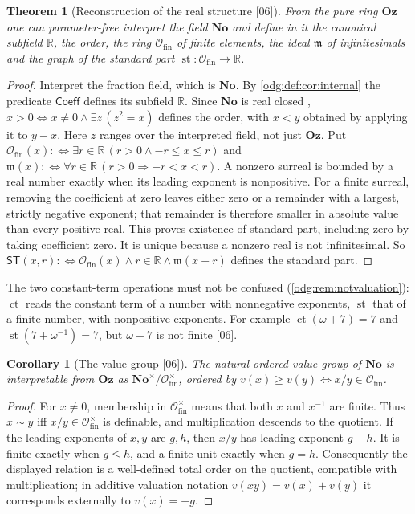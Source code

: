 \documentclass[11pt,oneside]{article}
\numberwithin{equation}{section}
\newtheorem{theorem}{Theorem}[section]
\newtheorem{corollary}[corollary]{Corollary}
\theoremstyle{definition}
\theoremstyle{remark}
\newcommand{\No}{\mathbf{No}}
\newcommand{\Oz}{\mathbf{Oz}}
\newcommand{\R}{\mathbb R}
\newcommand{\ct}{\operatorname{ct}}
\newcommand{\src}[1]{\textup{\textsf{\small[#1]}}}
\newcommand{\st}{\operatorname{st}}
\newcommand{\Ofin}{\mathcal O_{\mathrm{fin}}}
\begin{document}
\begin{theorem}[Reconstruction of the real structure \src{06}]\label{odg:def:thm:realrecovery}
From the pure ring $\Oz$ one can parameter-free interpret the field $\No$ and
define in it the canonical subfield $\R$, the order, the ring
$\Ofin$ of finite elements, the ideal $\mathfrak m$ of infinitesimals and the
graph of the standard part $\st:\Ofin\to\R$.
\end{theorem}
\begin{proof}
Interpret the fraction field, which is $\No$. By \cref{odg:def:cor:internal}
the predicate $\mathsf{Coeff}$ defines its subfield $\R$. Since $\No$ is real
closed \cite{Conway,Gonshor}, $x>0\Leftrightarrow x\ne0\wedge\exists z\,(z^2=x)$
defines the order, with $x<y$ obtained by applying it to $y-x$.
Here $z$ ranges over the interpreted field, not just $\Oz$.
Put $\Ofin(x):\Leftrightarrow\exists r\in\R\,(r>0\wedge-r\le x\le r)$ and
$\mathfrak m(x):\Leftrightarrow\forall r\in\R\,(r>0\Rightarrow-r<x<r)$. A
nonzero surreal is bounded by a real number exactly when its leading
exponent is nonpositive. For a finite surreal, removing the coefficient at
zero leaves either zero or a remainder with a largest, strictly negative
exponent; that remainder is
therefore smaller in absolute value than every positive real. This proves
existence of standard part, including zero by taking coefficient zero.
It is unique because a nonzero real is not infinitesimal. So
$\mathsf{ST}(x,r):\Leftrightarrow\Ofin(x)\wedge r\in\R\wedge\mathfrak m(x-r)$
defines the standard part.
\end{proof}

The two constant-term operations must not be confused
(\cref{odg:rem:notvaluation}): $\ct$ reads the constant term of a number with
nonnegative exponents, $\st$ that of a finite number, with nonpositive
exponents. For example $\ct(\omega+7)=7$ and $\st(7+\omega^{-1})=7$, but
$\omega+7$ is not finite \src{06}.

\begin{corollary}[The value group \src{06}]\label{odg:def:cor:valuegroup}
The natural ordered value group of $\No$ is interpretable from $\Oz$ as
$\No^\times/\Ofin^\times$, ordered by $v(x)\ge v(y)\Leftrightarrow x/y\in\Ofin$.
\end{corollary}
\begin{proof}
For $x\ne0$, membership in $\Ofin^\times$ means that both $x$ and $x^{-1}$
are finite. Thus $x\sim y$ iff $x/y\in\Ofin^\times$ is definable, and
multiplication descends to the quotient. If the leading exponents of $x,y$
are $g,h$, then $x/y$ has leading exponent $g-h$. It is finite exactly
when $g\le h$, and a finite unit exactly when $g=h$. Consequently the
displayed relation is a well-defined total order on the quotient,
compatible with multiplication; in additive valuation notation
$v(xy)=v(x)+v(y)$ it corresponds externally to $v(x)=-g$.
\end{proof}
\end{document}
